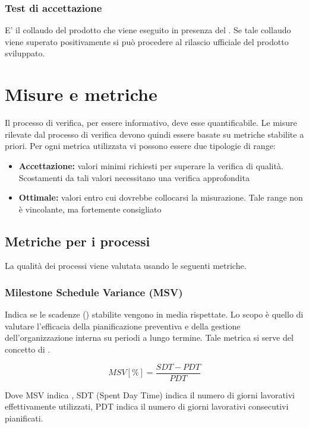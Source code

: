 \documentclass[12pt,a4paper]{article}
\begin{document}
\subsubsection{Test di accettazione}
E' il collaudo del prodotto  che viene eseguito in presenza del . Se tale collaudo viene superato positivamente si può procedere al rilascio ufficiale del prodotto sviluppato. 

\newpage

\section{Misure e metriche}\label{metriche}
Il processo di verifica, per essere informativo, deve esse quantificabile. Le misure rilevate dal processo di verifica devono quindi essere basate su metriche stabilite a priori. Per ogni metrica utilizzata vi possono essere due tipologie di range:

\begin{itemize}
	\item \textbf{Accettazione:} valori minimi richiesti per superare la verifica di qualità. Scostamenti da tali valori necessitano una verifica approfondita
	\item \textbf{Ottimale:} valori entro cui dovrebbe collocarsi la misurazione. Tale range non è vincolante, ma fortemente consigliato
\end{itemize}

\subsection{Metriche per i processi}\label{metriche_processi}
La qualità dei processi viene valutata usando le seguenti metriche.

\subsubsection{Milestone Schedule Variance (MSV)}
Indica se le scadenze () stabilite vengono in media rispettate. Lo scopo è quello di valutare l'efficacia della pianificazione preventiva e della gestione dell'organizzazione interna su periodi a lungo termine. Tale metrica si serve del concetto di .

\[MSV [\%] = \frac{SDT - PDT}{PDT}\]

Dove  MSV indica , SDT (Spent Day Time) indica il numero di giorni lavorativi effettivamente utilizzati, PDT indica il numero di giorni lavorativi consecutivi pianificati.
\end{document}

